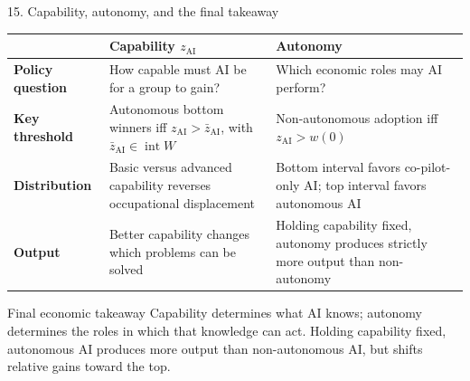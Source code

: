 \documentclass[aspectratio=169,11pt]{beamer}
\newcommand{\zAI}{z_{\mathrm{AI}}}
\newcommand{\zbAI}{\bar z_{\mathrm{AI}}}
\begin{document}
\begin{frame}{15. Capability, autonomy, and the final takeaway}
  \small
  \begin{tabular}{>{\bfseries}p{}p{}p{}}
    \toprule
      & Capability $\zAI$ & Autonomy \\
    \midrule
    Policy question
      & How capable must AI be for a group to gain?
      & Which economic roles may AI perform? \\
    Key threshold
      & Autonomous bottom winners iff $\zAI>\zbAI$, with $\zbAI\in\operatorname{int}W$
      & Non-autonomous adoption iff $\zAI>w(0)$ \\
    Distribution
      & Basic versus advanced capability reverses occupational displacement
      & Bottom interval favors co-pilot-only AI; top interval favors autonomous AI \\
    Output
      & Better capability changes which problems can be solved
      & Holding capability fixed, autonomy produces strictly more output than non-autonomy \\
    \bottomrule
  \end{tabular}

  \smallskip
  \begin{block}{Final economic takeaway}
    Capability determines what AI knows; autonomy determines the roles in which that knowledge can act. Holding capability fixed, autonomous AI produces more output than non-autonomous AI, but shifts relative gains toward the top.
  \end{block}
\end{frame}
\end{document}

